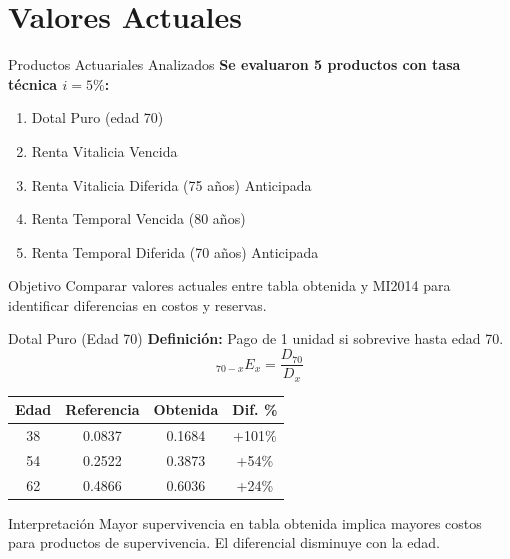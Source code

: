 \section{Valores Actuales}

\begin{frame}{Productos Actuariales Analizados}
  \textbf{Se evaluaron 5 productos con tasa técnica $i = 5\%$:}
  \begin{enumerate}
    \item Dotal Puro (edad 70)
    \item Renta Vitalicia Vencida
    \item Renta Vitalicia Diferida (75 años) Anticipada
    \item Renta Temporal Vencida (80 años)
    \item Renta Temporal Diferida (70 años) Anticipada
  \end{enumerate}
  
  \vspace{0.3cm}
  
  \begin{block}{Objetivo}
    Comparar valores actuales entre tabla obtenida y MI2014 para identificar diferencias en costos y reservas.
  \end{block}
\end{frame}

\begin{frame}{Dotal Puro (Edad 70)}
  \textbf{Definición:} Pago de 1 unidad si sobrevive hasta edad 70.
  \[ {}_{70-x}E_x = \frac{D_{70}}{D_x} \]

  \begin{table}
    \centering
    \begin{tabular}{cccc}
      \toprule
      \textbf{Edad} & \textbf{Referencia} & \textbf{Obtenida} & \textbf{Dif. \%} \\
      \midrule
      38 & 0.0837 & 0.1684 & +101\% \\
      54 & 0.2522 & 0.3873 & +54\% \\
      62 & 0.4866 & 0.6036 & +24\% \\
      \bottomrule
    \end{tabular}
  \end{table}
  
  \begin{alertblock}{Interpretación}
    Mayor supervivencia en tabla obtenida implica mayores costos para productos de supervivencia. El diferencial disminuye con la edad.
  \end{alertblock}
\end{frame}

